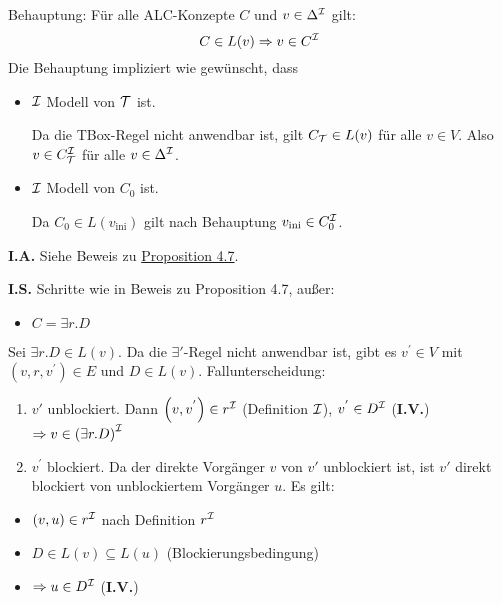 Behauptung: Für alle ALC-Konzepte $C$ und $v \in \Delta^{\mathcal{I}}$ gilt:
$$C \in L\left( v \right) \Rightarrow v \in C^\MI$$
Die Behauptung impliziert wie gewünscht, dass

\begin{itemize}
\item
  $\mathcal{I}$ Modell von $\mathcal{T}$ ist.

Da die TBox-Regel nicht anwendbar ist, gilt $C_{\MT} \in L\left( v \right)$ für alle $v \in V$. Also $v \in C_{\mathcal{T}}^{\mathcal{I}}$ für alle $v \in \Delta^{\mathcal{I}}$.

\item
  $\mathcal{I}$ Modell von $C_{0}$ ist.

Da $C_{0} \in L\left( v_{\text{ini}} \right)$ gilt nach Behauptung
$v_{\text{ini}} \in C_{0}^{\mathcal{I}}$.
\end{itemize}

\textbf{I.A.} Siehe Beweis zu
\protect\hyperlink{proposition-4.7-korrektheit}{Proposition 4.7}.

\textbf{I.S.} Schritte wie in Beweis zu Proposition 4.7, außer:

\begin{itemize}
\item
  $C = \exists r.D$
\end{itemize}

Sei $\exists r.D \in L\left( v \right)$. Da die $\exists'$-Regel
nicht anwendbar ist, gibt es $v^{'} \in V$ mit
$\left( v,r,v^{'} \right) \in E$ und $D \in L\left( v \right)$.
Fallunterscheidung:

\begin{enumerate}
\def\labelenumi{\arabic{enumi}.}
\item
  $v'$ unblockiert. Dann $\left( v,v^{'} \right) \in r^\MI$
  (Definition $\mathcal{I}$), $v^{'} \in D^{\mathcal{I}}$ (\textbf{I.V.})
  $\Rightarrow v \in \left( \exists r.D \right)^\MI$
\item
  $v^{'}$ blockiert. Da der direkte Vorgänger $v$ von $v'$
  unblockiert ist, ist $v'$ direkt blockiert von unblockiertem
  Vorgänger $u$. Es gilt:
\end{enumerate}

\begin{itemize}
\item
  $\left( v,u \right) \in r^\MI$ nach Definition $r^{\mathcal{I}}$
\item
  $D \in L\left( v \right) \subseteq L\left( u \right)$
  (Blockierungsbedingung)
\item
  $\Rightarrow u \in D^{\mathcal{I}}$ (\textbf{I.V.})
\end{itemize}

